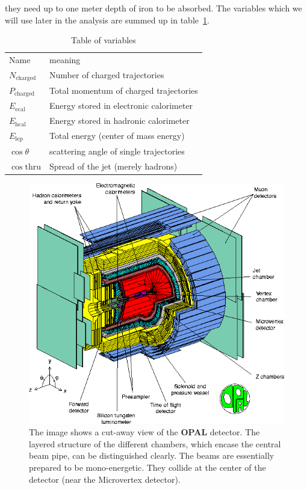they need up to one meter depth of iron to be absorbed. The variables which we will use later in the analysis are summed up
in table~\ref{tab:vars}.
\begin{table}[htpb]
    \centering
    \caption{Table of variables}
    \label{tab:vars}
    \begin{tabular}{l|l}
  \rowcolor{LightCyan} Name & meaning \\ 
    $N_{\mathrm{charged} }$ & Number of charged trajectories \\
    $P_{\mathrm{charged} }$ & Total momentum of charged trajectories \\
    $E_{\mathrm{ecal}}$ & Energy stored in electronic calorimeter \\
    $E_{\mathrm{hcal}}$ & Energy stored in hadronic calorimeter \\
    $E_{\mathrm{lep}}$ & Total energy (center of mass energy) \\
    $\cos\theta$ & scattering angle of single trajectories \\
    $\cos\mathrm{thru} $ & Spread of the jet (merely hadrons)\\
    \end{tabular}
\end{table}

\begin{figure}[htpb]
    \centering
    \includegraphics[width=1.0\linewidth]{figures/opal}
    \caption{The image shows a cut-away view of the \textbf{OPAL} detector\cite{CERN_OPAL}. The layered structure of the
    different chambers, which encase the central beam pipe, can be distinguished clearly. The beams are essentially
prepared to be mono-energetic. They collide at the center of the detector (near the Microvertex detector).}
    \label{fig:opal1}
\end{figure}

